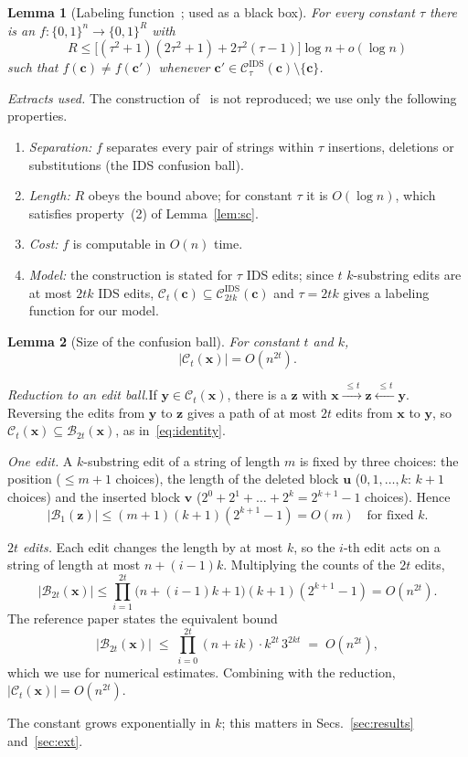 \documentclass[journal,10pt]{IEEEtran}
\newtheorem{lemma}{Lemma}
\newcommand{\step}[1]{\par\smallskip\noindent\emph{#1}\enspace}
\newcommand{\B}{\mathcal{B}}
\newcommand{\C}{\mathcal{C}}
\newcommand{\bx}{\mathbf{x}}
\newcommand{\by}{\mathbf{y}}
\newcommand{\bz}{\mathbf{z}}
\newcommand{\bu}{\mathbf{u}}
\newcommand{\bv}{\mathbf{v}}
\begin{document}
\begin{lemma}[Labeling function~\cite{sima_del}; used as a black box]\label{lem:label}
For every constant $\tau$ there is an $f:\{0,1\}^n\to\{0,1\}^R$ with
\[
R\le\bigl[(\tau^2+1)(2\tau^2+1)+2\tau^2(\tau-1)\bigr]\log n+o(\log n)
\]
such that $f(\mathbf c)\neq f(\mathbf c')$ whenever $\mathbf c'\in\C^{\mathrm{IDS}}_\tau(\mathbf c)\setminus\{\mathbf c\}$.
\end{lemma}
\emph{Extracts used.} The construction of~\cite{sima_del} is not reproduced; we use only the following properties.
\begin{enumerate}
\item[(E1)] \emph{Separation:} $f$ separates every pair of strings within $\tau$ insertions, deletions or substitutions (the IDS confusion ball).
\item[(E2)] \emph{Length:} $R$ obeys the bound above; for constant $\tau$ it is $O(\log n)$, which satisfies property~(2) of Lemma~\ref{lem:sc}.
\item[(E3)] \emph{Cost:} $f$ is computable in $O(n)$ time.
\item[(E4)] \emph{Model:} the construction is stated for $\tau$ IDS edits; since $t$ $k$-substring edits are at most $2tk$ IDS edits, $\C_t(\mathbf c)\subseteq\C^{\mathrm{IDS}}_{2tk}(\mathbf c)$ and $\tau=2tk$ gives a labeling function for our model.
\end{enumerate}

\begin{lemma}[Size of the confusion ball]\label{lem:ball}
For constant $t$ and $k$,
\[
|\C_t(\bx)|=O(n^{2t}).
\]
\end{lemma}
\begin{IEEEproof}
\emph{Reduction to an edit ball.}\enspace If $\by\in\C_t(\bx)$, there is a $\bz$ with $\bx\xrightarrow{\ \le t\ }\bz\xleftarrow{\ \le t\ }\by$. Reversing the edits from $\by$ to $\bz$ gives a path of at most $2t$ edits from $\bx$ to $\by$, so $\C_t(\bx)\subseteq\B_{2t}(\bx)$, as in~\eqref{eq:identity}.

\step{One edit.} A $k$-substring edit of a string of length $m$ is fixed by three choices: the position ($\le m+1$ choices), the length of the deleted block $\bu$ ($0,1,\dots,k$: $k+1$ choices) and the inserted block $\bv$ ($2^0+2^1+\dots+2^k=2^{k+1}-1$ choices). Hence
\[
|\B_1(\bz)|\le(m+1)(k+1)(2^{k+1}-1)=O(m)\quad\text{for fixed }k.
\]

\step{$2t$ edits.} Each edit changes the length by at most $k$, so the $i$-th edit acts on a string of length at most $n+(i-1)k$. Multiplying the counts of the $2t$ edits,
\[
|\B_{2t}(\bx)|\le\prod_{i=1}^{2t}\bigl(n+(i-1)k+1\bigr)(k+1)(2^{k+1}-1)=O(n^{2t}).
\]
The reference paper states the equivalent bound
\begin{equation}\label{eq:ballbound}
|\B_{2t}(\bx)|\;\le\;\prod_{i=0}^{2t}(n+ik)\cdot k^{2t}\,3^{2kt}\;=\;O(n^{2t}),
\end{equation}
which we use for numerical estimates. Combining with the reduction, $|\C_t(\bx)|=O(n^{2t})$.
\end{IEEEproof}
The constant grows exponentially in $k$; this matters in Secs.~\ref{sec:results} and~\ref{sec:ext}.
\end{document}
